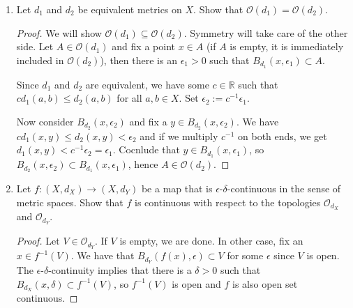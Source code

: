 \documentclass[a4paper]{article}
\begin{document}
\begin{enumerate}
    \item Let \(d_1\) and \(d_2\) be equivalent metrics on \(X\). Show that \(\mathcal{O}(d_1) = \mathcal{O}(d_2)\).

    \begin{proof}
        We will show \(\mathcal{O}(d_1) \subseteq \mathcal{O}(d_2)\). Symmetry will take care of the other side. Let \(A \in \mathcal{O}(d_1)\) and fix a point \(x \in A\) (if \(A\) is empty, it is immediately included in \(\mathcal{O}(d_2)\)), then there is an \(\epsilon_1 > 0\) such that \(B_{d_1}(x, \epsilon_1) \subset A\).

        Since \(d_1\) and \(d_2\) are equivalent, we have some \(c \in \mathbb{R}\) such that \(c d_1(a, b) \leq d_2(a, b)\) for all \(a, b \in X\). Set \(\epsilon_2 := c^{-1} \epsilon_1\).

        Now consider \(B_{d_2}(x, \epsilon_2)\) and fix a \(y \in B_{d_2}(x, \epsilon_2)\). We have \(c d_1(x, y) \leq d_2(x, y) < \epsilon_2\) and if we multiply \(c^{-1}\) on both ends, we get \(d_1(x, y) < c^{-1} \epsilon_2 = \epsilon_1\). Cocnlude that \(y \in B_{d_1}(x, \epsilon_1)\), so \(B_{d_2}(x, \epsilon_2) \subset B_{d_1}(x, \epsilon_1)\), hence \(A \in \mathcal{O}(d_2)\).
    \end{proof}

    \item Let \(f: (X, d_X) \longrightarrow (X, d_Y)\) be a map that is \(\epsilon\)-\(\delta\)-continuous in the sense of metric spaces. Show that \(f\) is continuous with respect to the topologies \(\mathcal{O}_{d_X}\) and \(\mathcal{O}_{d_Y}\).
    
    \begin{proof}
        Let \(V \in \mathcal{O}_{d_Y}\). If \(V\) is empty, we are done. In other case, fix an \(x \in f^{-1}(V)\). We have that \(B_{d_Y}(f(x), \epsilon) \subset V\) for some \(\epsilon\) since \(V\) is open. The \(\epsilon\)-\(\delta\)-continuity implies that there is a \(\delta > 0\) such that \(B_{d_X}(x, \delta) \subset f^{-1}(V)\), so \(f^{-1}(V)\) is open and \(f\) is also open set continuous. 
    \end{proof}

\end{enumerate}
\end{document}
